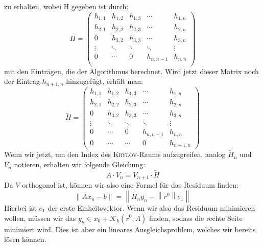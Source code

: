 \documentclass[12pt,a4paper]{scrartcl}
\numberwithin{equation}{section} %
\theoremstyle{definition}
\theoremstyle{plain}
\newcommand{\norm}[1]{\left\lVert#1\right\rVert}
\begin{document}
zu erhalten, wobei H gegeben ist durch:
\begin{equation}
H=\begin{pmatrix}
h_{1,1}&h_{1,2}&h_{1,3}&\dotsb&h_{1,n}\\
h_{2,1}&h_{2,2}&h_{2,3}&\dotsb&h_{2,n}\\
0&h_{3,2}&h_{3,3}&\dotsb&h_{3,n}\\
\vdots&\ddots&\ddots&\ddots&\vdots\\
0&\dotsb&0&h_{n,n-1}&h_{n,n}\\
\end{pmatrix}
\end{equation}
mit den Einträgen, die der Algorithmus berechnet. Wird jetzt dieser Matrix noch der Eintrag $h_{n+1,n}$ hinzugefügt,  erhält man:
\begin{equation}
\tilde{H}=\begin{pmatrix}
h_{1,1}&h_{1,2}&h_{1,3}&\dotsb&h_{1,n}\\
h_{2,1}&h_{2,2}&h_{2,3}&\dotsb&h_{2,n}\\
0&h_{3,2}&h_{3,3}&\dotsb&h_{3,n}\\
\vdots&\ddots&\ddots&\ddots&\vdots\\
0&\dotsb&0&h_{n,n-1}&h_{n,n}\\
0&\dotsb&\dotsb&0&h_{n+1,n}
\end{pmatrix}
\end{equation}
Wenn wir jetzt, um den Index des \textsc{Krylov}-Raums aufzugreifen, analog $\tilde{H}_n$ und $V_n$ notieren, erhalten wir folgende Gleichung:
\begin{equation}
A\cdot V_n=V_{n+1}\cdot \tilde{H}
\end{equation}
Da $V$ orthogonal ist, können wir also eine Formel für das Residuum finden:
\begin{equation}
\norm{Ax_n-b}=\norm{\tilde{H_n}y_n-\norm{r^0}e_1}
\end{equation}
Hierbei ist $e_1$ der erste Einheitsvektor. Wenn wir also das Residuum minimieren wollen, müssen wir das $y_n\in x_0+\mathcal{K}_k(r^0,A)$ finden, sodass die rechte Seite minimiert wird. Dies ist aber ein lineares Ausgleichsproblem, welches wir bereits lösen können.
\end{document}
